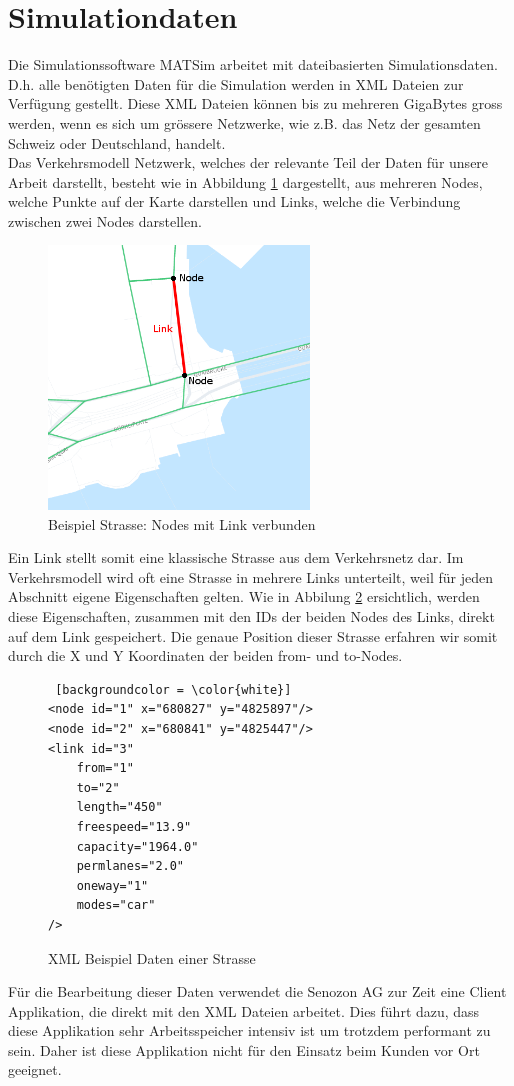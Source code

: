 \section{Simulationdaten}
Die Simulationssoftware MATSim arbeitet mit dateibasierten Simulationsdaten. D.h. alle benötigten Daten für die Simulation werden in XML Dateien zur Verfügung gestellt. Diese XML Dateien können bis zu mehreren GigaBytes gross werden, wenn es sich um grössere Netzwerke, wie z.B. das Netz der gesamten Schweiz oder Deutschland, handelt.\\
Das Verkehrsmodell Netzwerk, welches der relevante Teil der Daten für unsere Arbeit darstellt, besteht wie in Abbildung \ref{example_street} dargestellt, aus mehreren Nodes, welche Punkte auf der Karte darstellen und Links, welche die Verbindung zwischen zwei Nodes darstellen.\\
\begin{figure}[H]
\centering
\includegraphics[height=7cm]{images/Link_demo_edited.PNG}
\caption{Beispiel Strasse: Nodes mit Link verbunden}
\label{example_street}
\end{figure}
\noindent
Ein Link stellt somit eine klassische Strasse aus dem Verkehrsnetz dar. Im Verkehrsmodell wird oft eine Strasse in mehrere Links unterteilt, weil für jeden Abschnitt eigene Eigenschaften gelten. Wie in Abbilung \ref{street_details} ersichtlich, werden diese Eigenschaften, zusammen mit den IDs der beiden Nodes des Links, direkt auf dem Link gespeichert. Die genaue Position dieser Strasse erfahren wir somit durch die X und Y Koordinaten der beiden \glqq{}from\grqq{}- und \glqq{}to\grqq{}-Nodes. \\
\begin{figure}[H]
\centering
\lstset{language=XML}
\begin{lstlisting} [backgroundcolor = \color{white}]
<node id="1" x="680827" y="4825897"/>
<node id="2" x="680841" y="4825447"/>
<link id="3" 
	from="1" 
	to="2" 
	length="450" 
	freespeed="13.9" 
	capacity="1964.0" 
	permlanes="2.0" 
	oneway="1" 
	modes="car"
/>
\end{lstlisting}
\caption{XML Beispiel Daten einer Strasse}
\label{street_details}
\end{figure}
\noindent
Für die Bearbeitung dieser Daten verwendet die Senozon AG zur Zeit eine Client Applikation, die direkt mit den XML Dateien arbeitet. Dies führt dazu, dass diese Applikation sehr Arbeitsspeicher intensiv ist um trotzdem performant zu sein. Daher ist diese Applikation nicht für den Einsatz beim Kunden vor Ort geeignet.
